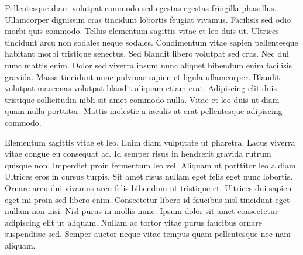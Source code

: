 Pellentesque diam volutpat commodo sed egestas egestas fringilla phasellus. Ullamcorper dignissim cras tincidunt lobortis feugiat vivamus. Facilisis sed odio morbi quis commodo. Tellus elementum sagittis vitae et leo duis ut. Ultrices tincidunt arcu non sodales neque sodales. Condimentum vitae sapien pellentesque habitant morbi tristique senectus. Sed blandit libero volutpat sed cras. Nec dui nunc mattis enim. Dolor sed viverra ipsum nunc aliquet bibendum enim facilisis gravida. Massa tincidunt nunc pulvinar sapien et ligula ullamcorper. Blandit volutpat maecenas volutpat blandit aliquam etiam erat. Adipiscing elit duis tristique sollicitudin nibh sit amet commodo nulla. Vitae et leo duis ut diam quam nulla porttitor. Mattis molestie a iaculis at erat pellentesque adipiscing commodo.

Elementum sagittis vitae et leo. Enim diam vulputate ut pharetra. Lacus viverra vitae congue eu consequat ac. Id semper risus in hendrerit gravida rutrum quisque non. Imperdiet proin fermentum leo vel. Aliquam ut porttitor leo a diam. Ultrices eros in cursus turpis. Sit amet risus nullam eget felis eget nunc lobortis. Ornare arcu dui vivamus arcu felis bibendum ut tristique et. Ultrices dui sapien eget mi proin sed libero enim. Consectetur libero id faucibus nisl tincidunt eget nullam non nisi. Nisl purus in mollis nunc. Ipsum dolor sit amet consectetur adipiscing elit ut aliquam. Nullam ac tortor vitae purus faucibus ornare suspendisse sed. Semper auctor neque vitae tempus quam pellentesque nec nam aliquam.